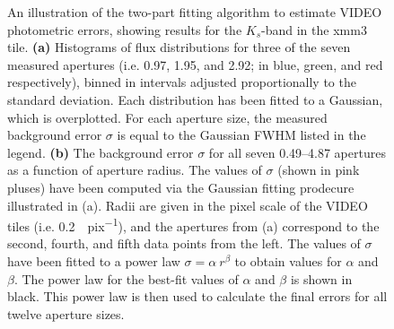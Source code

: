 \begin{figure}[!tpb]
\centering
{}
\caption[Error estimation procedure]{An illustration of the two-part fitting algorithm to estimate VIDEO photometric errors, showing results for the $K_{s}$-band in the xmm3 tile. \textbf{(a)} Histograms of flux distributions for three of the seven measured apertures (i.e. 0.97, 1.95, and \SI{2.92}{\arcsec}; in blue, green, and red respectively), binned in intervals adjusted proportionally to the standard deviation. Each distribution has been fitted to a Gaussian, which is overplotted. For each aperture size, the measured background error $\sigma$ is equal to the Gaussian FWHM listed in the legend. \textbf{(b)} The background error $\sigma$  for all seven \SIrange{0.49}{4.87}{\arcsec} apertures as a function of aperture radius. The values of $\sigma$ (shown in pink pluses) have been computed via the Gaussian fitting prodecure illustrated in (a). Radii are given in the pixel scale of the VIDEO tiles (i.e. \SI{0.2}{\arcsec.pix^{-1}}), and the apertures from (a) correspond to the second, fourth, and fifth data points from the left.  The values of $\sigma$ have been fitted to a power law $\sigma=\alpha \ r^{\beta}$ to obtain values for $\alpha$ and $\beta$. The power law for the best-fit values of $\alpha$ and $\beta$ is shown in black. This power law is then used to calculate the final errors for all twelve \DESVIDEO aperture sizes.}
\label{fig:flux_fitting}
\end{figure}


